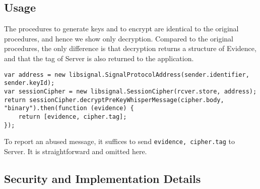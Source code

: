 \documentclass{article}
\begin{document}
\subsection{Usage}

The procedures to generate keys and to encrypt are 
identical to the original procedures,
and hence we show only decryption.
Compared to the original procedures,
the only difference is that decryption returns a structure of Evidence,
and that the tag of Server is also returned to 
the application.
{\small
\begin{verbatim}
var address = new libsignal.SignalProtocolAddress(sender.identifier, sender.keyId);
var sessionCipher = new libsignal.SessionCipher(rcver.store, address);
return sessionCipher.decryptPreKeyWhisperMessage(cipher.body, "binary").then(function (evidence) {
    return [evidence, cipher.tag];
});
\end{verbatim}
}
To report an abused message, 
it suffices to send {\tt evidence, cipher.tag} to Server.
It is straightforward and omitted here.


\subsection{Security and Implementation Details}
















\end{document}
